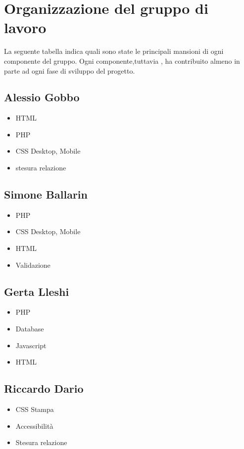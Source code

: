 \section{Organizzazione del gruppo di lavoro}

La seguente tabella indica quali sono state le principali mansioni di ogni componente del gruppo. Ogni componente,tuttavia , ha contribuito almeno in parte ad ogni fase di sviluppo del progetto.

\subsection{Alessio Gobbo}

\begin{itemize}
	\item HTML
	\item PHP 
	\item CSS Desktop, Mobile
	\item stesura relazione
\end{itemize}

\subsection{Simone Ballarin}

\begin{itemize}
	\item PHP 
	\item CSS Desktop, Mobile
	\item HTML
	\item Validazione
\end{itemize}

\subsection{Gerta Lleshi}

\begin{itemize}
	\item PHP
	\item Database
	\item Javascript
	\item HTML
\end{itemize}

\subsection{Riccardo Dario}

\begin{itemize}
	\item CSS Stampa
	\item Accessibilità
	\item Stesura relazione
\end{itemize}

